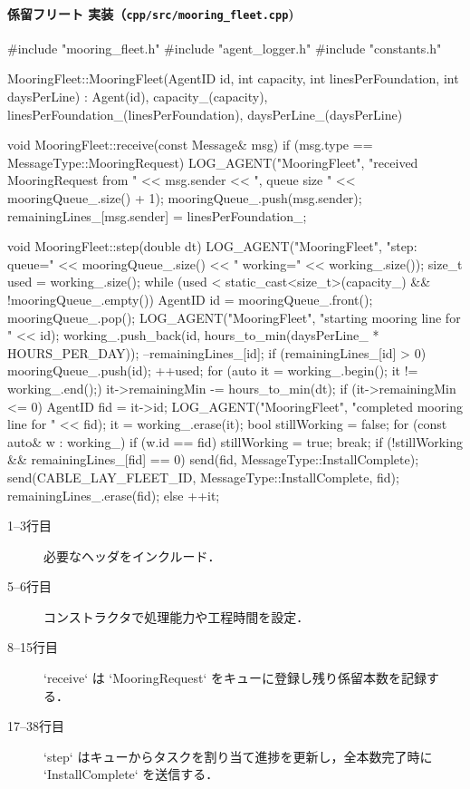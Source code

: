 \documentclass[10pt,letterpaper]{jsarticle}
\begin{document}
\paragraph{係留フリート 実装（\texttt{cpp/src/mooring\_fleet.cpp})}
\begin{cppcode}
#include "mooring_fleet.h"
#include "agent_logger.h"
#include "constants.h"

MooringFleet::MooringFleet(AgentID id, int capacity, int linesPerFoundation, int daysPerLine)
    : Agent(id), capacity_(capacity), linesPerFoundation_(linesPerFoundation), daysPerLine_(daysPerLine) {}

void MooringFleet::receive(const Message& msg) {
    if (msg.type == MessageType::MooringRequest) {
        LOG_AGENT("MooringFleet", "received MooringRequest from " << msg.sender
                  << ", queue size " << mooringQueue_.size() + 1);
        mooringQueue_.push(msg.sender);
        remainingLines_[msg.sender] = linesPerFoundation_;
    }
}

void MooringFleet::step(double dt) {
    LOG_AGENT("MooringFleet", "step: queue=" << mooringQueue_.size()
              << " working=" << working_.size());
    size_t used = working_.size();
    while (used < static_cast<size_t>(capacity_) && !mooringQueue_.empty()) {
        AgentID id = mooringQueue_.front();
        mooringQueue_.pop();
        LOG_AGENT("MooringFleet", "starting mooring line for " << id);
        working_.push_back({id, hours_to_min(daysPerLine_ * HOURS_PER_DAY)});
        --remainingLines_[id];
        if (remainingLines_[id] > 0) {
            mooringQueue_.push(id);
        }
        ++used;
    }
    for (auto it = working_.begin(); it != working_.end();) {
        it->remainingMin -= hours_to_min(dt);
        if (it->remainingMin <= 0) {
            AgentID fid = it->id;
            LOG_AGENT("MooringFleet", "completed mooring line for " << fid);
            it = working_.erase(it);
            bool stillWorking = false;
            for (const auto& w : working_) {
                if (w.id == fid) { stillWorking = true; break; }
            }
            if (!stillWorking && remainingLines_[fid] == 0) {
                send(fid, MessageType::InstallComplete);
                send(CABLE_LAY_FLEET_ID, MessageType::InstallComplete, fid);
                remainingLines_.erase(fid);
            }
        } else {
            ++it;
        }
    }
}
\end{cppcode}
\begin{description}
  \item[1--3行目] 必要なヘッダをインクルード．
  \item[5--6行目] コンストラクタで処理能力や工程時間を設定．
  \item[8--15行目] `receive` は `MooringRequest` をキューに登録し残り係留本数を記録する．
  \item[17--38行目] `step` はキューからタスクを割り当て進捗を更新し，全本数完了時に `InstallComplete` を送信する．
\end{description}
\end{document}

